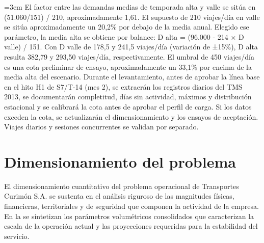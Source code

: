 \begingroup\emergencystretch=3em
El factor entre las demandas medias de temporada alta y valle se sitúa en (51.060/151) / 210, aproximadamente 1,61. El supuesto de 210 viajes/día en valle se sitúa aproximadamente un 20,2\% por debajo de la media anual. Elegido ese parámetro, la media alta se obtiene por balance: D alta = (96.000 - 214 × D valle) / 151. Con D valle de 178,5 y 241,5 viajes/día (variación de ±15\%), D alta resulta 382,79 y 293,50 viajes/día, respectivamente. El umbral de 450 viajes/día es una cota preliminar de ensayo, aproximadamente un 33,1\% por encima de la media alta del escenario. Durante el levantamiento, antes de aprobar la línea base en el hito H1 de S7/T-14 (mes 2), se extraerán los registros diarios del TMS 2013, se documentarán completitud, días sin actividad, máximos y distribución estacional y se calibrará la cota antes de aprobar el perfil de carga. Si los datos exceden la cota, se actualizarán el dimensionamiento y los ensayos de aceptación. Viajes diarios y sesiones concurrentes se validan por separado.\par\endgroup

\clearpage
\section{Dimensionamiento del problema}\label{sec:2-dimensionamiento}

El dimensionamiento cuantitativo del problema operacional de Transportes Curimón S.A. se sustenta en el análisis riguroso de las magnitudes físicas, financieras, territoriales y de seguridad que componen la actividad de la empresa. En la  se sintetizan los parámetros volumétricos consolidados que caracterizan la escala de la operación actual y las proyecciones requeridas para la estabilidad del servicio.

